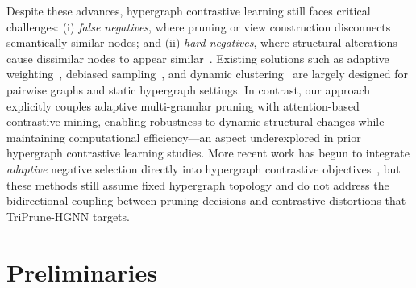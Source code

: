 \documentclass[10pt]{article}
\theoremstyle{plain}
\theoremstyle{definition}
\begin{document}
Despite these advances, hypergraph contrastive learning still faces critical challenges: (i) \emph{false negatives}, where pruning or view construction disconnects semantically similar nodes; and (ii) \emph{hard negatives}, where structural alterations cause dissimilar nodes to appear similar~\citep{sun2023learning, wang2023weighted, song2024chgnn}. Existing solutions such as adaptive weighting~\citep{xu2024contrastive, chen2021incremental}, debiased sampling~\citep{zhou2022debiased, chuang2020debiased}, and dynamic clustering~\citep{huynh2022boosting} are largely designed for pairwise graphs and static hypergraph settings. In contrast, our approach explicitly couples adaptive multi-granular pruning with attention-based contrastive mining, enabling robustness to dynamic structural changes while maintaining computational efficiency—an aspect underexplored in prior hypergraph contrastive learning studies. More recent work has begun to integrate \emph{adaptive} negative selection directly into hypergraph contrastive objectives~\citep{song2024chgnn, roh2024closer}, but these methods still assume fixed hypergraph topology and do not address the bidirectional coupling between pruning decisions and contrastive distortions that TriPrune-HGNN targets.

\section{Preliminaries}
\label{sec:preliminaries}
\end{document}
